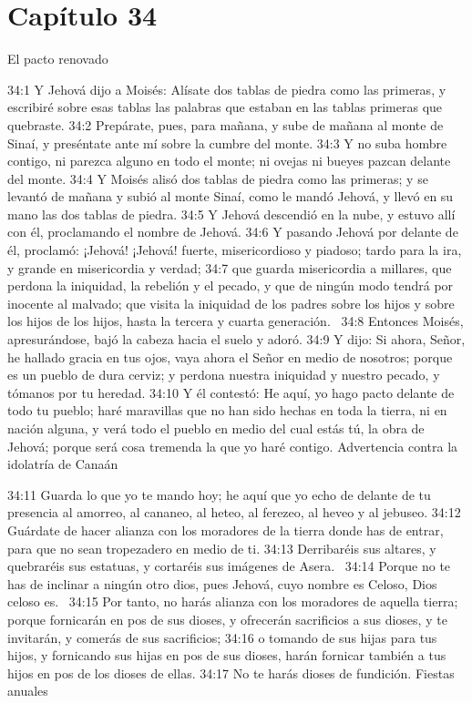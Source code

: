 \section*{Capítulo 34}
El pacto renovado 


34:1 Y Jehová dijo a Moisés: Alísate dos tablas de piedra como las primeras, y escribiré sobre esas tablas las palabras que estaban en las tablas primeras que quebraste. 
34:2 Prepárate, pues, para mañana, y sube de mañana al monte de Sinaí, y preséntate ante mí sobre la cumbre del monte. 
34:3 Y no suba hombre contigo, ni parezca alguno en todo el monte; ni ovejas ni bueyes pazcan delante del monte. 
34:4 Y Moisés alisó dos tablas de piedra como las primeras; y se levantó de mañana y subió al monte Sinaí, como le mandó Jehová, y llevó en su mano las dos tablas de piedra. 
34:5 Y Jehová descendió en la nube, y estuvo allí con él, proclamando el nombre de Jehová. 
34:6 Y pasando Jehová por delante de él, proclamó: ¡Jehová! ¡Jehová! fuerte, misericordioso y piadoso; tardo para la ira, y grande en misericordia y verdad; 
34:7 que guarda misericordia a millares, que perdona la iniquidad, la rebelión y el pecado, y que de ningún modo tendrá por inocente al malvado; que visita la iniquidad de los padres sobre los hijos y sobre los hijos de los hijos, hasta la tercera y cuarta generación.  
34:8 Entonces Moisés, apresurándose, bajó la cabeza hacia el suelo y adoró. 
34:9 Y dijo: Si ahora, Señor, he hallado gracia en tus ojos, vaya ahora el Señor en medio de nosotros; porque es un pueblo de dura cerviz; y perdona nuestra iniquidad y nuestro pecado, y tómanos por tu heredad. 
34:10 Y él contestó: He aquí, yo hago pacto delante de todo tu pueblo; haré maravillas que no han sido hechas en toda la tierra, ni en nación alguna, y verá todo el pueblo en medio del cual estás tú, la obra de Jehová; porque será cosa tremenda la que yo haré contigo. 
Advertencia contra la idolatría de Canaán 

34:11 Guarda lo que yo te mando hoy; he aquí que yo echo de delante de tu presencia al amorreo, al cananeo, al heteo, al ferezeo, al heveo y al jebuseo. 
34:12 Guárdate de hacer alianza con los moradores de la tierra donde has de entrar, para que no sean tropezadero en medio de ti. 
34:13 Derribaréis sus altares, y quebraréis sus estatuas, y cortaréis sus imágenes de Asera.  
34:14 Porque no te has de inclinar a ningún otro dios, pues Jehová, cuyo nombre es Celoso, Dios celoso es.  
34:15 Por tanto, no harás alianza con los moradores de aquella tierra; porque fornicarán en pos de sus dioses, y ofrecerán sacrificios a sus dioses, y te invitarán, y comerás de sus sacrificios; 
34:16 o tomando de sus hijas para tus hijos, y fornicando sus hijas en pos de sus dioses, harán fornicar también a tus hijos en pos de los dioses de ellas. 
34:17 No te harás dioses de fundición. 
Fiestas anuales 

